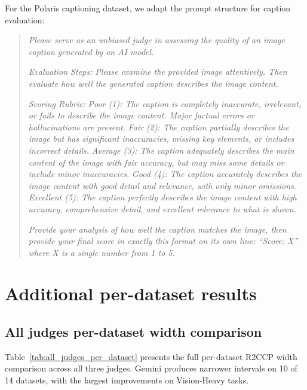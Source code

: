 \documentclass{article}
\begin{document}
For the Polaris captioning dataset, we adapt the prompt structure for caption evaluation:

\begin{quote}
\small
\textit{Please serve as an unbiased judge in assessing the quality of an image caption generated by an AI model.}

\textit{Evaluation Steps: Please examine the provided image attentively. Then evaluate how well the generated caption describes the image content.}

\textit{Scoring Rubric:}
\textit{Poor (1): The caption is completely inaccurate, irrelevant, or fails to describe the image content. Major factual errors or hallucinations are present.}
\textit{Fair (2): The caption partially describes the image but has significant inaccuracies, missing key elements, or includes incorrect details.}
\textit{Average (3): The caption adequately describes the main content of the image with fair accuracy, but may miss some details or include minor inaccuracies.}
\textit{Good (4): The caption accurately describes the image content with good detail and relevance, with only minor omissions.}
\textit{Excellent (5): The caption perfectly describes the image content with high accuracy, comprehensive detail, and excellent relevance to what is shown.}

\textit{Provide your analysis of how well the caption matches the image, then provide your final score in exactly this format on its own line: ``Score: X'' where X is a single number from 1 to 5.}
\end{quote}

\section{Additional per-dataset results}
\label{app:per_dataset}

\subsection{All judges per-dataset width comparison}

Table~\ref{tab:all_judges_per_dataset} presents the full per-dataset R2CCP width comparison across all three judges. Gemini produces narrower intervals on 10 of 14 datasets, with the largest improvements on Vision-Heavy tasks.
\end{document}
